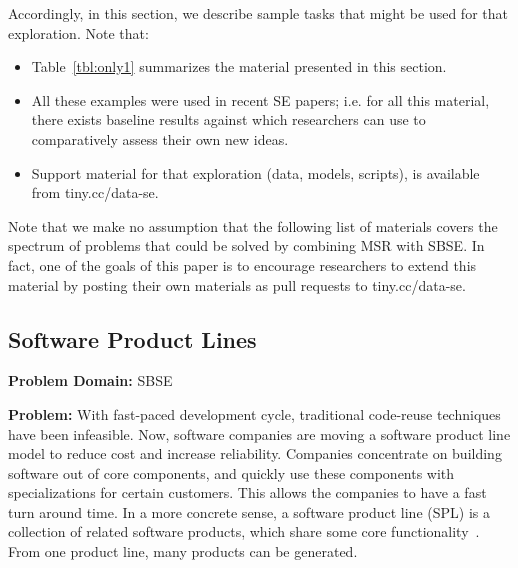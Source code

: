\documentclass[sigconf,anonymous,review]{acmart}
\newcommand\TODO[1]{\textcolor{ScarletRed}{\textbf{\colorbox{yellow}{\small TODO:}} \emph{#1}}\xspace}
\begin{document}
Accordingly, in this section, we describe sample
tasks that might be used for that exploration.
Note that:
\begin{itemize}[leftmargin=*]
\item
Table~\ref{tbl:only1} summarizes the material presented in this section. 
\item All these examples were used in recent SE
papers; i.e. for all this material, there exists baseline results against which researchers can use to  comparatively
assess  their own new ideas.
\item
Support material for that exploration (data, models, scripts),
is available from tiny.cc/data-se.



\end{itemize}
Note that we make no assumption that the following list of materials
covers the spectrum of problems that could be solved by combining MSR with SBSE. In fact, one of the goals of this paper is to encourage researchers to extend this material by posting their own materials as pull requests to tiny.cc/data-se.

    \subsection{Software Product Lines}\label{spl}
    \textbf{Problem Domain: } SBSE
    
    \noindent\textbf{Problem:} With fast-paced development cycle, traditional code-reuse techniques have been infeasible. Now, software companies are moving a software product line model to reduce cost and increase reliability. Companies concentrate on building software out of core components, and quickly use these components with specializations for certain customers. This allows the companies to have a fast turn around time. In a more concrete sense, a software product line (SPL) is a collection of related software products, which share some core functionality~\cite{harman2014search}. From one product line, many products can be generated. 
    
\end{document}
